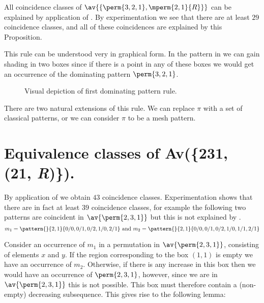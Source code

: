 All coincidence classes of \(\av{\{\perm{3,2,1}, \mperm{2,1}{R}\}}\) can be
explained by application of . By experimentation
we see that there are at least \(29\) coincidence classes, and all of these
coincidences are explained by this Proposition.

This rule can be understood very in graphical form. In the
pattern in  we can gain shading in two boxes since if
there is a point in any of these boxes we would get an occurrence of the
dominating pattern \(\perm{3,2,1}\).

\begin{figure}[htb]
    \begin{center}
        \raisebox{2ex}{\(\mapsto\)}

        \caption{Visual depiction of first dominating pattern rule.}
        \label{fig:rule1}
    \end{center}
\end{figure}

There are two natural extensions of this rule. We can replace \(\pi\)
with a set of classical patterns, or we can consider \(\pi\) to be a mesh pattern.

\section{Equivalence classes of Av(\{231, (21, \textit{R})\}).}
By application of  we obtain \(43\) coincidence
classes. Experimentation shows that there are in fact at least \(39\) coincidence
classes, for example the following two patterns are coincident in
\(\av{\perm{2,3,1}}\) but this is not explained by .
\begin{equation*}
    m_1 = \pattern{}{2,1}{0/0,0/1,0/2,1/0,2/1} \text{ and } m_2 = \pattern{}{2,1}{0/0,0/1,0/2,1/0,1/1,2/1}
\end{equation*}

Consider an occurrence of \(m_1\) in a permutation in \(\av{\perm{2,3,1}}\), consisting
of elements \(x\) and \(y\). If the region corresponding
to the box \((1,1)\) is empty we have an occurrence of \(m_2\). Otherwise, if there is any
increase in this box then we would have an occurrence of \(\perm{2,3,1}\),
however, since we are in \(\av{\perm{2,3,1}}\) this is not possible. This box
must therefore contain a (non-empty) decreasing subsequence.
 This gives rise to the following lemma:

